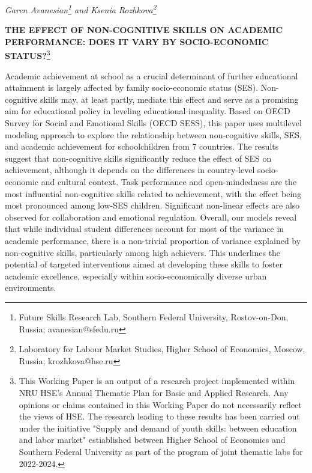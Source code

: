 \documentclass[
  12pt,
  a4paper,
]{article}
\author{}
\date{\vspace{-2.5em}}
\begin{document}
\begin{center}
\textit{Garen Avanesian\footnote{Future Skills Research Lab, Southern Federal University, Rostov-on-Don, Russia; avanesian@sfedu.ru} and Ksenia Rozhkova\footnote{Laboratory for Labour Market Studies, Higher School of Economics, Moscow, Russia; krozhkova@hse.ru}}
\end{center}

\begin{center}
\large\textbf{THE EFFECT OF NON-COGNITIVE SKILLS ON ACADEMIC PERFORMANCE: DOES IT VARY BY SOCIO-ECONOMIC STATUS?}\footnote{This Working Paper is an output of a research project implemented within NRU HSE’s Annual Thematic Plan for Basic and Applied Research. Any opinions or claims contained in this Working Paper do not necessarily reflect the views of HSE.
The research leading to these results has been carried out under the initiative "Supply and demand of youth skills: between education and labor market" estiablished between Higher School of Economics and Southern Federal University as part of the program of joint thematic labs for 2022-2024.}
\end{center}

Academic achievement at school as a crucial determinant of further
educational attainment is largely affected by family socio-economic
status (SES). Non-cognitive skills may, at least partly, mediate this
effect and serve as a promising aim for educational policy in leveling
educational inequality. Based on OECD Survey for Social and Emotional
Skills (OECD SESS), this paper uses multilevel modeling approach to
explore the relationship between non-cognitive skills, SES, and academic
achievement for schoolchildren from 7 countries. The results suggest
that non-cognitive skills significantly reduce the effect of SES on
achievement, although it depends on the differences in country-level
socio-economic and cultural context. Task performance and
open-mindedness are the most influential non-cognitive skills related to
achievement, with the effect being most pronounced among low-SES
children. Significant non-linear effects are also observed for
collaboration and emotional regulation. Overall, our models reveal that
while individual student differences account for most of the variance in
academic performance, there is a non-trivial proportion of variance
explained by non-cognitive skills, particularly among high achievers.
This underlines the potential of targeted interventions aimed at
developing these skills to foster academic excellence, especially within
socio-economically diverse urban environments.
\end{document}
